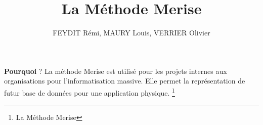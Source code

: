 \documentclass{beamer}
\begin{document}
\begin{frame}{\textbf{Pourquoi} ?}
La méthode Merise est utilisé pour les projets internes aux organisations pour l’informatisation massive.
Elle permet la représentation de futur base de données pour une application physique.
\footnote{La Méthode Merise}
\end{frame}

\begin{frame}
\title{La Méthode Merise} %
\author{FEYDIT Rémi, MAURY Louis, VERRIER Olivier}
\titlepage
\end{frame}
\end{document}
